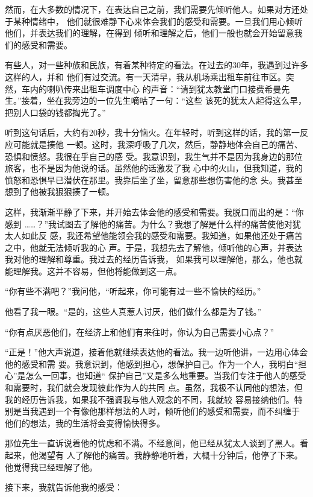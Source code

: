 \documentclass{ctexart}
\begin{document}
然而，在大多数的情况下，在表达自己之前，我们需要先倾听他人。如果对方还处于某种情绪中，
他们就很难静下心来体会我们的感受和需要。一旦我们用心倾听他们，并表达我们的理解，在得到
倾听和理解之后，他们一般也就会开始留意我们的感受和需要。

有些人，对一些种族和民族，有着某种特定的看法。在过去的30年，我遇到过许多这样的人，并和
他们有过交流。有一天清早，我从机场乘出租车前往市区。突然，车内的喇叭传来出租车调度中心
的声音：``请到犹太教堂门口接费希曼先生。''接着，坐在我旁边的一位先生嘀咕了一句：``这些
该死的犹太人起得这么早，把别人口袋的钱都掏光了。''

听到这句话后，大约有20秒，我十分恼火。在年轻时，听到这样的话，我的第一反应可能就是揍他
一顿。这时，我深呼吸了几次，然后，静静地体会自己的痛苦、恐惧和愤怒。我很在乎自己的感
受。我意识到，我生气并不是因为我身边的那位旅客，也不是因为他说的话。虽然他的话激发了我
心中的火山，但我知道，我的愤怒和恐惧早已潜伏在那里。我靠后坐了坐，留意那些想伤害他的念
头。我甚至想到了他被我狠狠揍了一顿。

这样，我渐渐平静了下来，并开始去体会他的感受和需要。我脱口而出的是：``你感到
\ldots\ldots？''我试图去了解他的痛苦。为什么？我想了解是什么样的痛苦使他对犹太人如此反
感，我还希望他能领会我的感受和需要。我知道，如果他还处于痛苦之中，他就无法倾听我的心
声。于是，我想先去了解他，倾听他的心声，并表达我对他的理解和尊重。我过去的经历告诉我，
如果我可以理解他，那么，他也就能理解我。这并不容易，但他将能做到这一点。

``你有些不满吧？''我问他，``听起来，你可能有过一些不愉快的经历。''

他看了我一眼。``是的，这些人真惹人讨厌，他们做什么都是为了钱。''

``你有点厌恶他们，在经济上和他们有来往时，你认为自己需要小心点？''

``正是！''他大声说道，接着他就继续表达他的看法。我一边听他讲，一边用心体会他的感受和需
要。我意识到，他感到担心，想保护自己。作为一个人，我明白``担心''是怎么一回事，也知道``
保护自己''又是多么地重要。当我们专注于他人的感受和需要时，我们就会发现彼此作为人的共同
点。虽然，我极不认同他的想法，但我的经历告诉我，如果我不强调我与他人观念的不同，我就较
容易接纳他们。特别是当我遇到一个有像他那样想法的人时，倾听他们的感受和需要，而不纠缠于
他们的想法，我的生活将会变得愉快得多。

那位先生一直诉说着他的忧虑和不满。不经意间，他已经从犹太人谈到了黑人。看起来，他渴望有
人了解他的痛苦。我静静地听着，大概十分钟后，他停了下来。他觉得我已经理解了他。

接下来，我就告诉他我的感受：
\end{document}
